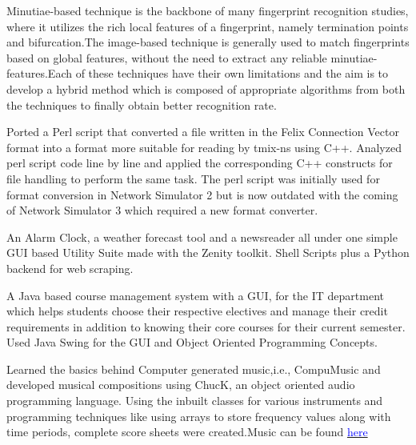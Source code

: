 \documentclass[11pt,a4paper,roman]{moderncv}        %
\begin{document}
Minutiae-based technique is the backbone of many fingerprint recognition studies, where it utilizes
the rich local features of a fingerprint, namely termination points and bifurcation.The image-based
technique is generally used to match fingerprints based on global features, without the need to
extract any reliable minutiae-features.Each of these techniques have their own limitations and the aim is to develop a hybrid method which is composed of appropriate algorithms from both the techniques to finally obtain better recognition rate. 

Ported a Perl script that converted a file written in the Felix Connection Vector format into a format more suitable for reading by tmix-ns using C++. Analyzed perl script code line by line and applied the corresponding C++ constructs for file handling to perform the same task. The perl script was initially used for format conversion in Network Simulator 2 but is now outdated with the coming of Network Simulator 3 which required a new format converter.

An Alarm Clock, a weather forecast tool and a newsreader all under one simple GUI based Utility Suite made  with the Zenity toolkit. Shell Scripts plus a Python backend for web scraping.

A Java based course management system with a GUI, for the IT department which helps students choose their respective electives and manage their credit requirements in addition to knowing their core courses for their current semester. Used Java Swing for the GUI and Object Oriented Programming Concepts.
 
Learned the basics behind Computer generated music,i.e., CompuMusic and developed musical compositions using ChucK, an object oriented audio programming language. Using the inbuilt classes for various instruments and programming techniques like using arrays to store frequency values along with time periods, complete score sheets were created.Music can be found \href{https://soundcloud.com/ujjwal-pasupulety}{\textcolor{blue}{here}}
\end{document}
